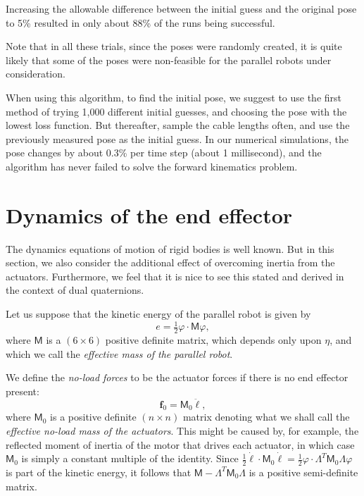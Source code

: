 \documentclass[reqno,12pt]{amsart}
\begin{document}
Increasing the allowable difference between the initial guess and the original pose to 5\% resulted in only about 88\% of the runs being successful.

Note that in all these trials, since the poses were randomly created, it is quite likely that some of the poses were non-feasible for the parallel robots under consideration.

When using this algorithm, to find the initial pose, we suggest to use the first method of trying 1,000 different initial guesses, and choosing the pose with the lowest loss function.  But thereafter, sample the cable lengths often, and use the previously measured pose as the initial guess.  In our numerical simulations, the pose changes by about 0.3\% per time step (about 1 millisecond), and the algorithm has never failed to solve the forward kinematics problem.

\section{Dynamics of the end effector}
\label{dynamics}

The dynamics equations of motion of rigid bodies is well known.  But in this section, we also consider the additional effect of overcoming inertia from the actuators.  Furthermore, we feel that it is nice to see this stated and derived in the context of dual quaternions.

Let us suppose that the kinetic energy of the parallel robot is given by
\begin{equation}
\label{ke}
e = \tfrac12 \varphi \cdot \mathsf M \varphi,
\end{equation}
where $\mathsf M$ is a $(6 \times 6)$ positive definite matrix, which depends only upon $\eta$, and which we call the \emph{effective mass of the parallel robot}.

We define the \emph{no-load forces} to be the actuator forces if there is no end effector present:
\begin{equation}
\bm f_0 = \mathsf M_0 \ddot{\bm \ell},
\end{equation}
where $\mathsf M_0$ is a positive definite $(n\times n)$ matrix denoting what we shall call the \emph{effective no-load mass of the actuators}.  This might be caused by, for example, the reflected moment of inertia of the motor that drives each actuator, in which case $\mathsf M_0$ is simply a constant multiple of the identity.  Since $\tfrac12 \dot{\bm\ell} \cdot \mathsf M_0 \dot{\bm\ell} = \tfrac12 \varphi \cdot \mathsf\Lambda^T \mathsf M_0 \mathsf \Lambda \varphi$ is part of the kinetic energy, it follows that $\mathsf M - \mathsf \Lambda^T \mathsf M_0 \mathsf \Lambda$ is a positive semi-definite matrix.
\end{document}
